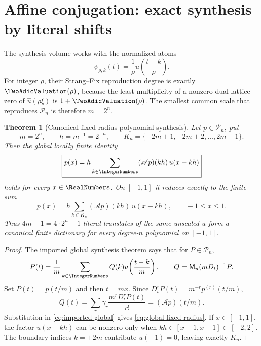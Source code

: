 \documentclass[11pt,oneside]{article}
\numberwithin{equation}{section}
\newtheorem{theorem}{Theorem}[section]
\theoremstyle{definition}
\theoremstyle{remark}
\newcommand{\PiN}{\mathcal P}
\newcommand{\App}{\mathscr A}
\newcommand{\MGF}{\mathsf M}
\begin{document}
\section{Affine conjugation: exact synthesis by literal shifts}
\label{sec:fixed-radius}

The synthesis volume works with the normalized atoms
\begin{equation}
 \psi_{\rho,k}(t)=\frac1\rho u\!\left(\frac{t-k}{\rho}\right).
 \label{eq:normalized-atoms}
\end{equation}
For integer $\rho$, their Strang--Fix reproduction degree is exactly
$\TwoAdicValuation(\rho)$, because the least multiplicity of a nonzero dual-lattice zero
of $\widehat u(\rho\xi)$ is $1+\TwoAdicValuation(\rho)$.  The smallest common scale that
reproduces $\PiN_n$ is therefore $m=2^n$.

\begin{theorem}[Canonical fixed-radius polynomial synthesis]
\label{thm:fixed-radius}
Let $p\in\PiN_n$, put
\begin{equation}
 m=2^n,
 \qquad h=m^{-1}=2^{-n},
 \qquad K_n=\{-2m+1,-2m+2,\ldots,2m-1\}.
 \label{eq:m-h-K}
\end{equation}
Then the global locally finite identity
\begin{equation}
 \boxed{
 p(x)=h\sum_{k\in\IntegerNumbers}(\App p)(kh)\,u(x-kh)
 }
 \label{eq:global-fixed-radius}
\end{equation}
holds for every $x\in\RealNumbers$.  On $[-1,1]$ it reduces exactly to the finite sum
\begin{equation}
 \boxed{
 p(x)=h\sum_{k\in K_n}(\App p)(kh)\,u(x-kh),
 \qquad -1\le x\le1.
 }
 \label{eq:finite-fixed-radius}
\end{equation}
Thus $4m-1=4\cdot2^n-1$ literal translates of the same unscaled $u$ form a
canonical finite dictionary for every degree-$n$ polynomial on $[-1,1]$.
\end{theorem}

\begin{proof}
The imported global synthesis theorem says that for $P\in\PiN_n$,
\begin{equation}
 P(t)=\frac1m\sum_{k\in\IntegerNumbers}Q(k)
 u\!\left(\frac{t-k}{m}\right),
 \qquad
 Q=\MGF_u(mD_t)^{-1}P.
 \label{eq:imported-global}
\end{equation}
Set $P(t)=p(t/m)$ and then $t=mx$.  Since
$D_t^rP(t)=m^{-r}p^{(r)}(t/m)$,
\[
 Q(t)=\sum_r\gamma_r\frac{m^rD_t^rP(t)}{r!}
     =(\App p)(t/m).
\]
Substitution in \eqref{eq:imported-global} gives
\eqref{eq:global-fixed-radius}.  If $x\in[-1,1]$, the factor
$u(x-kh)$ can be nonzero only when $kh\in[x-1,x+1]\subset[-2,2]$.
The boundary indices $k=\pm2m$ contribute $u(\pm1)=0$, leaving exactly
$K_n$.
\end{proof}
\end{document}
